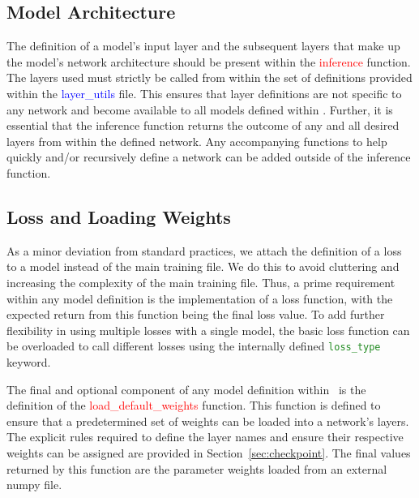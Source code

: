 \documentclass{llncs}
\begin{document}
\subsection{Model Architecture}
The definition of a model's input layer and the subsequent layers that make up the model's network architecture should be present within the \textcolor{red}{inference} function.
The layers used must strictly be called from within the set of definitions provided within the \textcolor{blue}{layer\_utils} file.
This ensures that layer definitions are not specific to any network and become available to all models defined within \acro.
Further, it is essential that the inference function returns the outcome of any and all desired layers from within the defined network.
Any accompanying functions to help quickly and/or recursively define a network can be added outside of the inference function.


\subsection{Loss and Loading Weights}
As a minor deviation from standard practices, we attach the definition of a loss to a model instead of the main training file.
We do this to avoid cluttering and increasing the complexity of the main training file.
Thus, a prime requirement within any model definition is the implementation of a loss function, with the expected return from this function being the final loss value.
To add further flexibility in using multiple losses with a single model, the basic loss function can be overloaded to call different losses using the internally defined \texttt{\textcolor{ForestGreen}{loss\_type}} keyword.

The final and optional component of any model definition within \acro~is the definition of the \textcolor{red}{load\_default\_weights} function.
This function is defined to ensure that a predetermined set of weights can be loaded into a network's layers.
The explicit rules required to define the layer names and ensure their respective weights can be assigned are provided in Section~\ref{sec:checkpoint}.
The final values returned by this function are the parameter weights loaded from an external numpy file.
\end{document}
